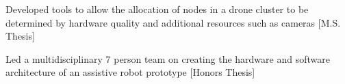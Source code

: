 \documentclass[]{deedy-resume-reversed}
\begin{document}
\begin{minipage}[t]{0.68\textwidth}
\descript{}
\begin{tightemize}
\item Developed tools to allow the allocation of nodes in a drone cluster to be determined by hardware quality and additional resources such as cameras [M.S. Thesis]
\item Led a multidisciplinary 7 person team on creating the hardware and software architecture of an assistive robot prototype [Honors Thesis]
\end{tightemize}
\sectionsep


%
%

\end{minipage}
\hfill
\end{document}
